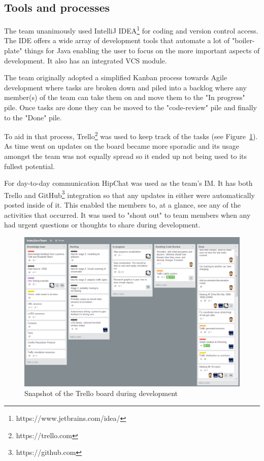 \subsection{Tools and processes}

The team unanimously used IntelliJ IDEA\footnote{https://www.jetbrains.com/idea/} for coding and version control access. The IDE offers a wide array of development tools that automate a lot of "boiler-plate" things for Java enabling the user to focus on the more important aspects of development. It also has an integrated VCS module.

The team originally adopted a simplified Kanban\cite{Peterson2015, Radig2016} process towards Agile development where tasks are broken down and piled into a backlog where any member(s) of the team can take them on and move them to the "In progress" pile. Once tasks are done they can be moved to the "code-review" pile and finally to the "Done" pile.

To aid in that process, Trello\footnote{https://trello.com} was used to keep track of the tasks (see Figure~\ref{fig:trello}). As time went on updates on the board became more sporadic and its usage amongst the team was not equally spread so it ended up not being used to its fullest potential. 

For day-to-day communication HipChat was used as the team's IM. It has both Trello and GitHub\footnote{https://github.com} integration so that any updates in either were automatically posted inside of it. This enabled the members to, at a glance, see any of the activities that occurred. It was used to "shout out" to team members when any had urgent questions or thoughts to share during development.

\begin{figure}[!h]
	\vspace{1.5em}
  	\caption{Snapshot of the Trello board during development}
  	\label{fig:trello}
  	\centering
	\includegraphics[width=1\textwidth]{figs/Tools/trello.png}
  	\vspace{1.5em}
\end{figure}

